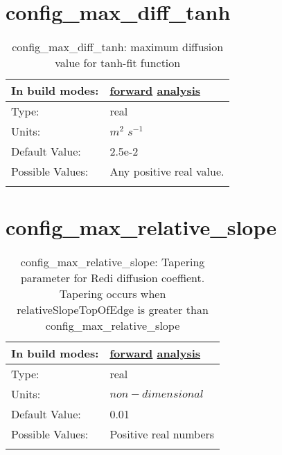 \section[config\_max\_diff\_tanh]{config\_max\_diff\_tanh}
\label{sec:nm_sec_config_max_diff_tanh}
\begin{center}
\begin{longtable}{| p{2.0in} || p{4.0in} |}
    \hline
    In build modes: & \hyperref[subsec:forward_nm_tab_vmix_tanh]{forward} \hyperref[subsec:analysis_nm_tab_vmix_tanh]{analysis} \\
    \hline
    Type: & real \\
    \hline
    Units: & $m^2$ $s^{-1}$ \\
    \hline
    Default Value: & 2.5e-2 \\
    \hline
    Possible Values: & Any positive real value. \\
    \hline
    \caption{config\_max\_diff\_tanh: maximum diffusion value for tanh-fit function}
\end{longtable}
\end{center}
\section[config\_max\_relative\_slope]{config\_max\_relative\_slope}
\label{sec:nm_sec_config_max_relative_slope}
\begin{center}
\begin{longtable}{| p{2.0in} || p{4.0in} |}
    \hline
    In build modes: & \hyperref[subsec:forward_nm_tab_mesoscale_eddy_parameterization]{forward} \hyperref[subsec:analysis_nm_tab_mesoscale_eddy_parameterization]{analysis} \\
    \hline
    Type: & real \\
    \hline
    Units: & $non-dimensional$ \\
    \hline
    Default Value: & 0.01 \\
    \hline
    Possible Values: & Positive real numbers \\
    \hline
    \caption{config\_max\_relative\_slope: Tapering parameter for Redi diffusion coeffient.  Tapering occurs when relativeSlopeTopOfEdge is greater than config\_max\_relative\_slope}
\end{longtable}
\end{center}

